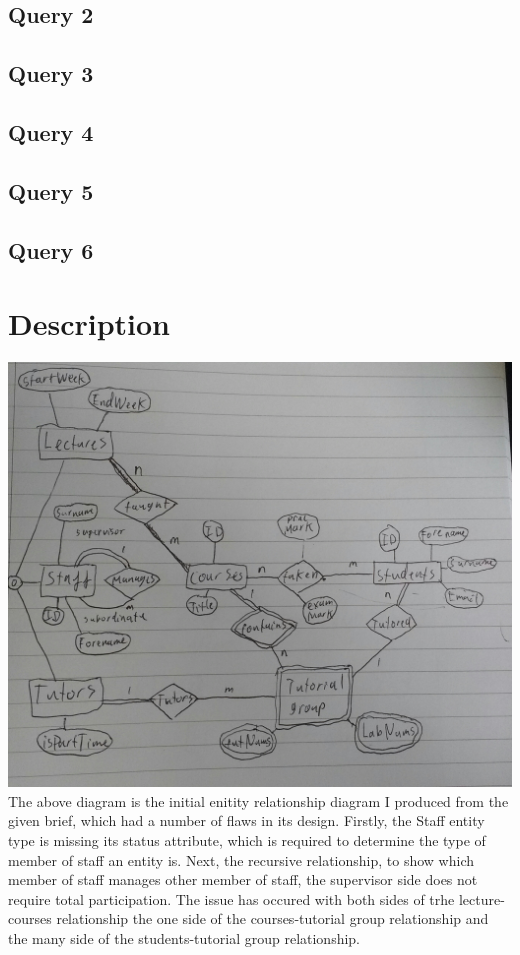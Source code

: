 \documentclass[12pt]{article}
\begin{document}
\subsection{Query 2}
\subsection{Query 3}
\subsection{Query 4}
\subsection{Query 5}
\subsection{Query 6}

\section{Description}
\includegraphics[width=\linewidth]{ER}
The above diagram is the initial enitity relationship diagram I produced from the given brief, which had a number of flaws in its design.
Firstly, the Staff entity type is missing its status attribute, which is required to determine the type of member of staff an entity is.
Next, the recursive relationship, to show which member of staff manages other member of staff, the supervisor side does not require total participation.
The issue has occured with both sides of trhe lecture-courses relationship the one side of the courses-tutorial group relationship and the many side of the students-tutorial group relationship.
\end{document}
